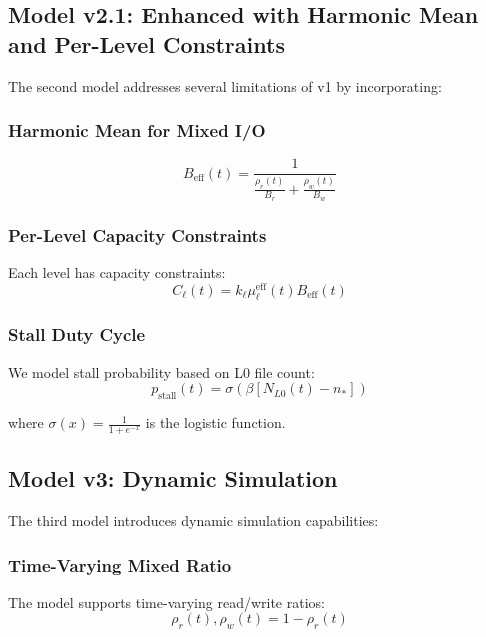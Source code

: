 \documentclass[11pt,twocolumn]{article}
\newcommand{\pstall}{p_{\text{stall}}}
\newcommand{\mueff}{\mu^{\text{eff}}}
\begin{document}
\subsection{Model v2.1: Enhanced with Harmonic Mean and Per-Level Constraints}

The second model addresses several limitations of v1 by incorporating:

\subsubsection{Harmonic Mean for Mixed I/O}
\begin{equation}
B_{\text{eff}}(t) = \frac{1}{\frac{\rho_r(t)}{B_r} + \frac{\rho_w(t)}{B_w}}
\end{equation}

\subsubsection{Per-Level Capacity Constraints}
Each level has capacity constraints:
\begin{equation}
C_\ell(t) = k_\ell \mueff_\ell(t) B_{\text{eff}}(t)
\end{equation}

\subsubsection{Stall Duty Cycle}
We model stall probability based on L0 file count:
\begin{equation}
\pstall(t) = \sigma(\beta [N_{L0}(t) - n_*])
\end{equation}

where $\sigma(x) = \frac{1}{1 + e^{-x}}$ is the logistic function.

\subsection{Model v3: Dynamic Simulation}

The third model introduces dynamic simulation capabilities:

\subsubsection{Time-Varying Mixed Ratio}
The model supports time-varying read/write ratios:
\begin{equation}
\rho_r(t), \rho_w(t) = 1 - \rho_r(t)
\end{equation}
\end{document}
